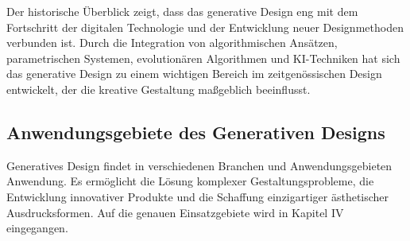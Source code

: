 Der historische Überblick zeigt, dass das generative Design eng mit dem Fortschritt der digitalen Technologie und der Entwicklung neuer Designmethoden verbunden ist. Durch die Integration von algorithmischen Ansätzen, parametrischen Systemen, evolutionären Algorithmen und KI-Techniken hat sich das generative Design zu einem wichtigen Bereich im zeitgenössischen Design entwickelt, der die kreative Gestaltung maßgeblich beeinflusst.

\subsection*{Anwendungsgebiete des Generativen Designs}
Generatives Design findet in verschiedenen Branchen und Anwendungsgebieten Anwendung. Es ermöglicht die Lösung komplexer Gestaltungsprobleme, die Entwicklung innovativer Produkte und die Schaffung einzigartiger ästhetischer Ausdrucksformen. Auf die genauen Einsatzgebiete wird in Kapitel IV eingegangen.
